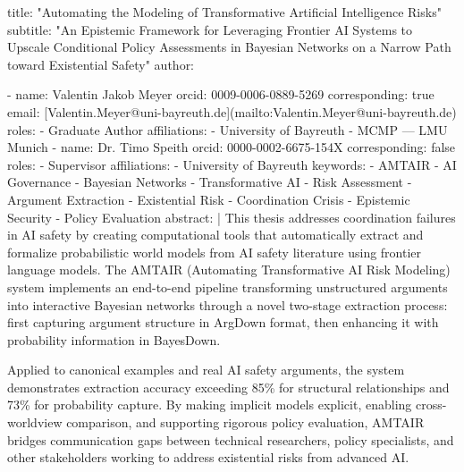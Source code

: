 \documentclass[
  11pt,
  letterpaper,
]{book}
\newenvironment{Shaded}{\begin{snugshade}}{\end{snugshade}}
\newcommand{\AnnotationTok}[1]{\textcolor[rgb]{0.37,0.37,0.37}{#1}}
\newcommand{\CommentTok}[1]{\textcolor[rgb]{0.37,0.37,0.37}{#1}}
\newcommand{\NormalTok}[1]{\textcolor[rgb]{0.00,0.23,0.31}{#1}}
\newcommand{\OtherTok}[1]{\textcolor[rgb]{0.00,0.23,0.31}{#1}}
\newcommand{\SpecialStringTok}[1]{\textcolor[rgb]{0.13,0.47,0.30}{#1}}
\begin{document}
\begin{Shaded}
\begin{Highlighting}[]
\AnnotationTok{title:}\CommentTok{ "Automating the Modeling of Transformative Artificial Intelligence Risks"}
\AnnotationTok{subtitle:}\CommentTok{ "An Epistemic Framework for Leveraging Frontier AI Systems to Upscale Conditional Policy Assessments in Bayesian Networks on a Narrow Path toward Existential Safety" author:}

\SpecialStringTok{{-} }\NormalTok{name: Valentin Jakob Meyer orcid: 0009{-}0006{-}0889{-}5269 corresponding: true email: }\CommentTok{[}\OtherTok{Valentin.Meyer@uni{-}bayreuth.de}\CommentTok{](mailto:Valentin.Meyer@uni{-}bayreuth.de)}\NormalTok{ roles:}
\SpecialStringTok{    {-} }\NormalTok{Graduate Author affiliations:}
\SpecialStringTok{    {-} }\NormalTok{University of Bayreuth}
\SpecialStringTok{    {-} }\NormalTok{MCMP — LMU Munich}
\SpecialStringTok{{-} }\NormalTok{name: Dr. Timo Speith orcid: 0000{-}0002{-}6675{-}154X corresponding: false roles:}
\SpecialStringTok{    {-} }\NormalTok{Supervisor affiliations:}
\SpecialStringTok{    {-} }\NormalTok{University of Bayreuth keywords:}
\SpecialStringTok{{-} }\NormalTok{AMTAIR}
\SpecialStringTok{{-} }\NormalTok{AI Governance}
\SpecialStringTok{{-} }\NormalTok{Bayesian Networks}
\SpecialStringTok{{-} }\NormalTok{Transformative AI}
\SpecialStringTok{{-} }\NormalTok{Risk Assessment}
\SpecialStringTok{{-} }\NormalTok{Argument Extraction}
\SpecialStringTok{{-} }\NormalTok{Existential Risk}
\SpecialStringTok{{-} }\NormalTok{Coordination Crisis}
\SpecialStringTok{{-} }\NormalTok{Epistemic Security}
\SpecialStringTok{{-} }\NormalTok{Policy Evaluation abstract: | This thesis addresses coordination failures in AI safety by creating computational tools that automatically extract and formalize probabilistic world models from AI safety literature using frontier language models. The AMTAIR (Automating Transformative AI Risk Modeling) system implements an end{-}to{-}end pipeline transforming unstructured arguments into interactive Bayesian networks through a novel two{-}stage extraction process: first capturing argument structure in ArgDown format, then enhancing it with probability information in BayesDown.}

\NormalTok{Applied to canonical examples and real AI safety arguments, the system demonstrates extraction accuracy exceeding 85\% for structural relationships and 73\% for probability capture. By making implicit models explicit, enabling cross{-}worldview comparison, and supporting rigorous policy evaluation, AMTAIR bridges communication gaps between technical researchers, policy specialists, and other stakeholders working to address existential risks from advanced AI.}


\end{Highlighting}
\end{Shaded}
\end{document}
